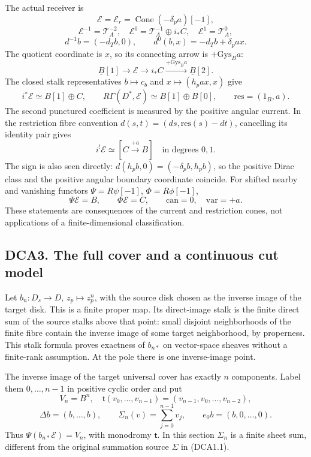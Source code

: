 The actual receiver is \[
\mathscr E=\mathscr E_r=\operatorname{Cone}(-\delta_pa)[-1],
\] \[
\mathscr E^{-1}=\mathscr T_A^{-2},\quad
\mathscr E^0=\mathscr T_A^{-1}\oplus i_*C,\quad
\mathscr E^1=\mathscr T_A^0,
\] \[
d^{-1}b=(-d_Tb,0),\qquad d^0(b,x)=-d_Tb+\delta_pax.
\tag{DCA2.3}
\] The quotient coordinate is \(x\), so its connecting arrow is
\(+\mathrm{Gys}_Ba\): \[
\underline B[1]\longrightarrow\mathscr E\longrightarrow i_*C
\xrightarrow{+\mathrm{Gys}_Ba}\underline B[2].
\tag{DCA2.4}
\] The closed stalk representatives \(b\mapsto c_b\) and
\(x\mapsto(h_pax,x)\) give \[
i^*\mathscr E\simeq B[1]\oplus C,
\qquad R\Gamma(D^*,\mathscr E)\simeq B[1]\oplus B[0],
\qquad\mathrm{res}=(1_B,a).
\tag{DCA2.5}
\] The second punctured coefficient is measured by the positive angular
current. In the restriction fibre convention
\(d(s,t)=(ds,\mathrm{res}(s)-dt)\), cancelling its identity pair gives
\[
i^!\mathscr E\simeq[C\xrightarrow{+a}B]
\quad\text{in degrees }0,1.
\tag{DCA2.6}
\] The sign is also seen directly: \(d(h_pb,0)=(-\delta_pb,h_pb)\), so
the positive Dirac class and the positive angular boundary coordinate
coincide. For shifted nearby and vanishing functors \(\Psi=R\psi[-1]\),
\(\Phi=R\phi[-1]\), \[
\Psi\mathscr E=B,\qquad\Phi\mathscr E=C,\qquad
\mathrm{can}=0,\quad\mathrm{var}=+a.
\tag{DCA2.7}
\] These statements are consequences of the current and restriction
cones, not applications of a finite-dimensional classification.

\subsection{DCA3. The full cover and a continuous cut
model}\label{dca3.-the-full-cover-and-a-continuous-cut-model}

Let \(b_n:D_s\to D\), \(z_p\mapsto z_p^n\), with the source disk chosen
as the inverse image of the target disk. This is a finite proper map.
Its direct-image stalk is the finite direct sum of the source stalks
above that point: small disjoint neighborhoods of the finite fibre
contain the inverse image of some target neighborhood, by properness.
This stalk formula proves exactness of \(b_{n*}\) on vector-space
sheaves without a finite-rank assumption. At the pole there is one
inverse-image point.

The inverse image of the target universal cover has exactly \(n\)
components. Label them \(0,\ldots,n-1\) in positive cyclic order and put
\[
V_n=B^n,\quad
\mathsf t(v_0,\ldots,v_{n-1})=(v_{n-1},v_0,\ldots,v_{n-2}),
\] \[
\Delta b=(b,\ldots,b),\qquad
\Sigma_n(v)=\sum_{j=0}^{n-1}v_j,\qquad
e_0b=(b,0,\ldots,0).
\tag{DCA3.1}
\] Thus \(\Psi(b_{n*}\mathscr E)=V_n\), with monodromy \(\mathsf t\). In
this section \(\Sigma_n\) is a finite sheet sum, different from the
original summation source \(\Sigma\) in (DCA1.1).

